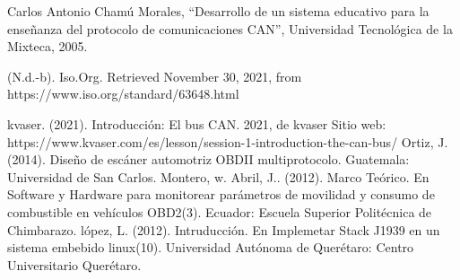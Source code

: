 \begin{thebibliography}{99}
 Carlos Antonio Chamú Morales, “Desarrollo de un sistema educativo para la enseñanza del protocolo de comunicaciones CAN”, Universidad Tecnológica de la Mixteca, 2005.

%







 (N.d.-b). Iso.Org. Retrieved November 30, 2021, from https://www.iso.org/standard/63648.html

  kvaser. (2021). Introducción: El bus CAN. 2021, de kvaser Sitio web: https://www.kvaser.com/es/lesson/session-1-introduction-the-can-bus/
 Ortiz, J. (2014). Diseño de escáner automotriz OBDII multiprotocolo. Guatemala: Universidad de San Carlos.
 Montero, w. Abril, J.. (2012). Marco Teórico. En Software y Hardware para monitorear parámetros de movilidad y consumo de combustible en vehículos OBD2(3). Ecuador: Escuela Superior Politécnica de Chimbarazo. 
 lópez, L. (2012). Intruducción. En Implemetar Stack J1939 en un sistema embebido linux(10). Universidad Autónoma de Querétaro: Centro Universitario Querétaro.


\end{thebibliography}
